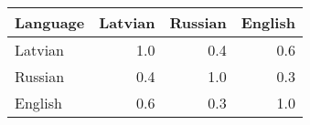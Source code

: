 \begin{tabular}{lrrr}
\toprule
Language &     Latvian & Russian & English \\
\midrule
Latvian       &  1.0 &  0.4 &  0.6 \\
Russian       &  0.4 &  1.0 &  0.3 \\
English       &  0.6 &  0.3 &  1.0 \\
\bottomrule
\end{tabular}
